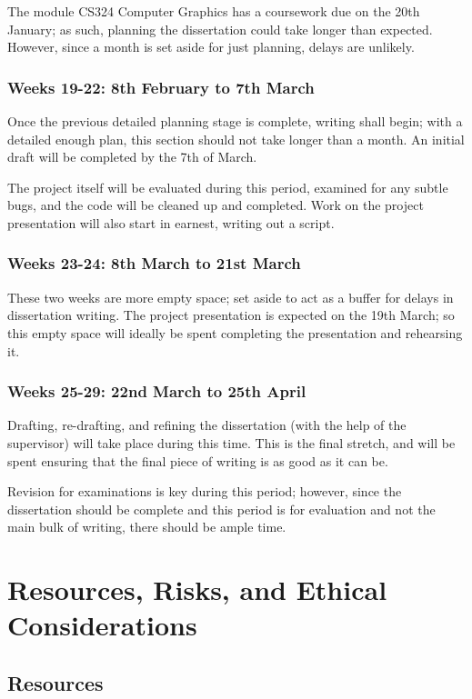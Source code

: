 \documentclass[12pt, a4paper]{scrartcl}
\begin{document}
The module CS324 Computer Graphics has a coursework due on the 20th January; as such, planning the dissertation could take longer than expected. However, since a month is set aside for just planning, delays are unlikely.

\subsubsection{Weeks 19-22: 8th February to 7th March}

Once the previous detailed planning stage is complete, writing shall begin; with a detailed enough plan, this section should not take longer than a month. An initial draft will be completed by the 7th of March.

The project itself will be evaluated during this period, examined for any subtle bugs, and the code will be cleaned up and completed. Work on the project presentation will also start in earnest, writing out a script.

\subsubsection{Weeks 23-24: 8th March to 21st March}

These two weeks are more empty space; set aside to act as a buffer for delays in dissertation writing. The project presentation is expected on the 19th March; so this empty space will ideally be spent completing the presentation and rehearsing it.

\subsubsection{Weeks 25-29: 22nd March to 25th April}

Drafting, re-drafting, and refining the dissertation (with the help of the supervisor) will take place during this time. This is the final stretch, and will be spent ensuring that the final piece of writing is as good as it can be.

Revision for examinations is key during this period; however, since the dissertation should be complete and this period is for evaluation and not the main bulk of writing, there should be ample time.

\section{Resources, Risks, and Ethical Considerations}

\subsection{Resources}
\end{document}
